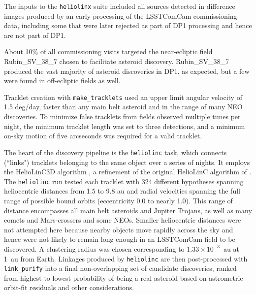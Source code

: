 The inputs to the {\tt heliolinx} suite included all sources detected in difference images produced by an early processing of the \gls{LSSTComCam} commissioning data,  including some that were later rejected as part of \gls{DP1} processing and hence are not part of \gls{DP1}.

About 10\% of all commissioning visits targeted the near-ecliptic field Rubin\_SV\_38\_7 chosen to facilitate asteroid discovery.
Rubin\_SV\_38\_7 produced the vast majority of asteroid discoveries in DP1, as expected, but a few were found in off-ecliptic fields as well.

Tracklet creation with {\tt make\_tracklets} used an upper limit angular velocity of 1.5 \gls{deg}/day, faster than any main belt asteroid and in the range of many \gls{NEO} discoveries.
To minimize false tracklets from fields observed multiple times per night, the minimum \gls{tracklet} length was set to three detections, and a minimum on-sky motion of five arcseconds was required for a valid \gls{tracklet}.

The heart of the discovery \gls{pipeline} is the {\tt heliolinc} task, which connects (``links") tracklets belonging to the same object over a series of nights.
It employs the HelioLinC3D algorithm \citep{2020DPS....5221101E,2022DPS....5450404H}, a refinement of the original HelioLinC algorithm of \citet{2018AJ....156..135H}.
The {\tt heliolinc} run tested each \gls{tracklet} with 324 different hypotheses spanning heliocentric distances from 1.5 to 9.8 \gls{au} and radial velocities spanning the full range of possible bound orbits (eccentricity 0.0 to nearly 1.0).
This range of distance encompasses all main belt asteroids and Jupiter Trojans, as well as many comets and Mars-crossers and some \glspl{NEO}.
Smaller heliocentric distances were not attempted here because nearby objects move rapidly across the sky and hence were not likely to remain long enough in an \gls{LSSTComCam} field to be discovered.
A clustering radius was chosen corresponding to $1.33 \times 10^{-3}$~au at 1~au from Earth. Linkages produced by {\tt heliolinc} are then post-processed with {\tt link\_purify} into a final non-overlapping set of candidate discoveries, ranked from highest to lowest probability of being a real asteroid based on astrometric orbit-fit residuals and other considerations.
